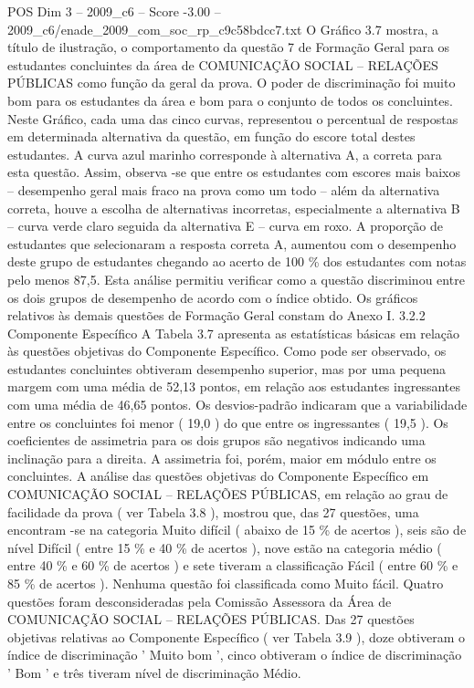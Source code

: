 \begin{textsample}{POS Dim 3 – 2009\_c6 – Score -3.00 – 2009\_c6/enade\_2009\_com\_soc\_rp\_c9c58bdcc7.txt}
O Gráfico 3.7 mostra, a título de ilustração, o comportamento da questão 7 de Formação Geral para os estudantes concluintes da área de COMUNICAÇÃO SOCIAL – RELAÇÕES PÚBLICAS como função da geral da prova.
O poder de discriminação foi muito bom para os estudantes da área e bom para o conjunto de todos os concluintes.
Neste Gráfico, cada uma das cinco curvas, representou o percentual de respostas em determinada alternativa da questão, em função do escore total destes estudantes.
A curva azul marinho corresponde à alternativa A, a correta para esta questão.
Assim, observa -se que entre os estudantes com escores mais baixos – desempenho geral mais fraco na prova como um todo – além da alternativa correta, houve a escolha de alternativas incorretas, especialmente a alternativa B – curva verde claro seguida da alternativa E – curva em roxo.
A proporção de estudantes que selecionaram a resposta correta A, aumentou com o desempenho deste grupo de estudantes chegando ao acerto de 100 \% dos estudantes com notas pelo menos 87,5.
Esta análise permitiu verificar como a questão discriminou entre os dois grupos de desempenho de acordo com o índice obtido.
Os gráficos relativos às demais questões de Formação Geral constam do Anexo I. 3.2.2 Componente Específico A Tabela 3.7 apresenta as estatísticas básicas em relação às questões objetivas do Componente Específico.
Como pode ser observado, os estudantes concluintes obtiveram desempenho superior, mas por uma pequena margem com uma média de 52,13 pontos, em relação aos estudantes ingressantes com uma média de 46,65 pontos.
Os desvios-padrão indicaram que a variabilidade entre os concluintes foi menor ( 19,0 ) do que entre os ingressantes ( 19,5 ).
Os coeficientes de assimetria para os dois grupos são negativos indicando uma inclinação para a direita.
A assimetria foi, porém, maior em módulo entre os concluintes.
A análise das questões objetivas do Componente Específico em COMUNICAÇÃO SOCIAL – RELAÇÕES PÚBLICAS, em relação ao grau de facilidade da prova ( ver Tabela 3.8 ), mostrou que, das 27 questões, uma encontram -se na categoria Muito difícil ( abaixo de 15 \% de acertos ), seis são de nível Difícil ( entre 15 \% e 40 \% de acertos ), nove estão na categoria médio ( entre 40 \% e 60 \% de acertos ) e sete tiveram a classificação Fácil ( entre 60 \% e 85 \% de acertos ).
Nenhuma questão foi classificada como Muito fácil.
Quatro questões foram desconsideradas pela Comissão Assessora da Área de COMUNICAÇÃO SOCIAL – RELAÇÕES PÚBLICAS.
Das 27 questões objetivas relativas ao Componente Específico ( ver Tabela 3.9 ), doze obtiveram o índice de discriminação ' Muito bom ', cinco obtiveram o índice de discriminação ' Bom ' e três tiveram nível de discriminação Médio.

\end{textsample}

